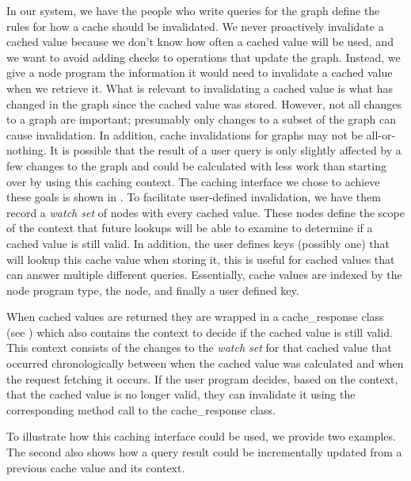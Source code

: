 \documentclass[letterpaper,twocolumn,11pt,tight]{article}
\begin{document}
    In our system, we have the people who write queries for the graph define the rules for how a cache should be invalidated. We never proactively invalidate a cached value because we don't know how often a cached value will be used, and we want to avoid adding checks to operations that update the graph. Instead, we give a node program the information it would need to invalidate a cached value when we retrieve it. What is relevant to invalidating a cached value is what has changed in the graph since the cached value was stored. However, not all changes to a graph are important; presumably only changes to a subset of the graph can cause invalidation. In addition, cache invalidations for graphs may not be all-or-nothing. It is possible that the result of a user query is only slightly affected by a few changes to the graph and could be calculated with less work than starting over by using this caching context.
The caching interface we chose to achieve these goals is shown in . To facilitate user-defined invalidation, we have them record a \emph{watch set} of nodes with every cached value. These nodes define the scope of the context that future lookups will be able to examine to determine if a cached value is still valid. 
In addition, the user defines keys (possibly one) that will lookup this cache value when storing it, this is useful for cached values that can answer multiple different queries. 
Essentially, cache values are indexed by the node program type, the node, and finally a user defined key. 

    When cached values are returned they are wrapped in a cache\_response class (see ) which also contains the context to decide if the cached value is still valid. This context consists of the changes to the \emph{watch set} for that cached value that occurred chronologically between when the cached value was calculated and when the request fetching it occurs. If the user program decides, based on the context, that the cached value is no longer valid, they can invalidate it using the corresponding method call to the cache\_response class.
    
    To illustrate how this caching interface could be used, we provide two examples. The second also shows how a query result could be incrementally updated from a previous cache value and its context.
\end{document}
